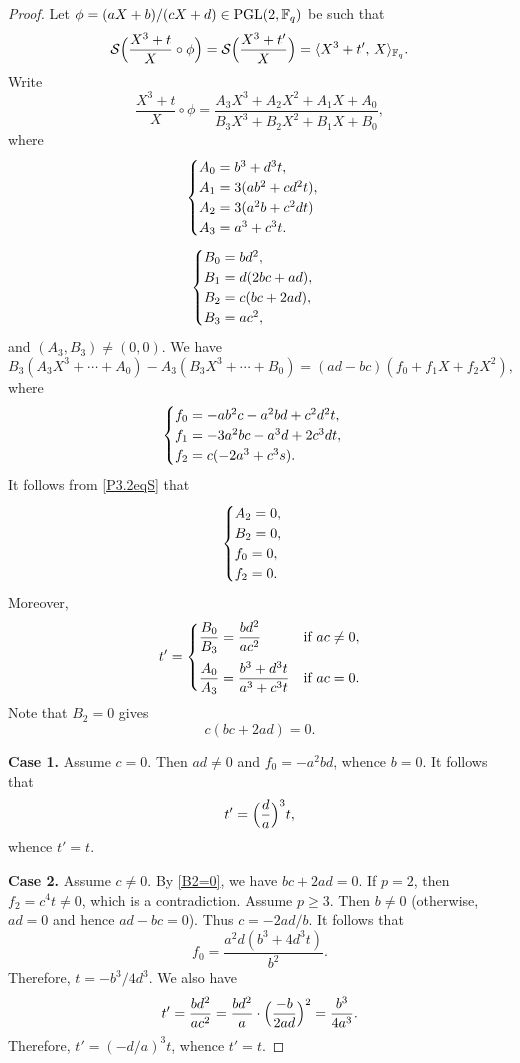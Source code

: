\documentclass{amsart}
\numberwithin{equation}{section}
\theoremstyle{definition}
\newcommand{\f}{\Bbb F}
\newcommand{\pgl}{\mathrm{PGL}}
\begin{document}
\begin{proof}
Let $\phi=(aX+b)/(cX+d)\in\pgl(2,\f_q)$ be such that
\begin{equation}\label{P3.2eqS}
\mathcal S\Bigl(\frac{X^3+t}X\circ\phi\Bigr)=\mathcal S\Bigl(\frac{X^3+t'}X\Bigr)=\langle X^3+t',\, X\rangle_{\f_q}.
\end{equation}
Write
\[
\frac{X^3+t}X\circ\phi=\frac{A_3X^3+A_2X^2+A_1X+A_0}{B_3X^3+B_2X^2+B_1X+B_0},
\]
where
\begin{equation}\label{P3.2A}
\begin{cases}
A_0=b^3 + d^3 t,\cr
A_1=3 (a b^2+c d^2 t),\cr
A_2=3 (a^2 b + c^2 d t)\cr
A_3=a^3+c^3 t.
\end{cases}
\end{equation}
\begin{equation}\label{P3.2B}
\begin{cases}
B_0=b d^2,\cr
B_1=d (2 b c + a d),\cr
B_2=c (b c+2 a d),\cr
B_3=a c^2,
\end{cases}
\end{equation}
and $(A_3,B_3)\ne(0,0)$. We have
\[
B_3(A_3X^3+\cdots+A_0)-A_3(B_3X^3+\cdots+B_0)=(ad-bc)(f_0+f_1X+f_2X^2),
\]
where
\begin{equation}\label{P3.2f0-2}
\begin{cases}
f_0=-a b^2 c-a^2 b d+c^2 d^2 t,\cr
f_1=-3 a^2 b c - a^3 d + 2 c^3 d t,\cr
f_2=c (-2 a^3 + c^3 s).
\end{cases}
\end{equation}
It follows from \eqref{P3.2eqS} that
\begin{equation}\label{P1.1-1}
\begin{cases}
A_2=0,\cr
B_2=0,\cr
f_0=0,\cr
f_2=0.
\end{cases}
\end{equation}
Moreover,
\begin{equation}\label{P1.1-2}
t'=\begin{cases}
\displaystyle\frac{B_0}{B_3}=\displaystyle\frac{bd^2}{ac^2}&\text{if}\ ac\ne0, \vspace{0.6em}\cr
\displaystyle\frac{A_0}{A_3}=\displaystyle\frac{b^3+d^3t}{a^3+c^3t}&\text{if}\ ac=0.
\end{cases}
\end{equation}
Note that $B_2=0$ gives
\begin{equation}\label{B2=0}
c(bc+2ad)=0.
\end{equation}

\medskip
{\bf Case 1.} Assume $c=0$. Then $ad\ne 0$ and $f_0=-a^2bd$, whence $b=0$. It follows that 
\[
t'=\Bigl(\frac da\Bigr)^3t,
\]
whence $t'=t$.

\medskip
{\bf Case 2.} 
Assume $c\ne 0$. By \eqref{B2=0}, we have $bc+2ad=0$. 
If $p=2$, then $f_2=c^4t\ne 0$, which is a contradiction.
Assume $p\ge 3$. Then $b\ne 0$ (otherwise, $ad=0$ and hence $ad-bc=0$). Thus $c=-2ad/b$. It follows that 
\[
f_0=\frac{a^2 d \left(b^3+4 d^3 t\right)}{b^2}.
\]
Therefore, $t=-b^3/4d^3$. We also have
\[
t'=\frac{bd^2}{ac^2}=\frac{bd^2}a\cdot\Bigl(\frac {-b}{2ad}\Bigr)^2=\frac{b^3}{4a^3}.
\]
Therefore, $t'=(-d/a)^3t$, whence $t'=t$.
\end{proof}
\end{document}
